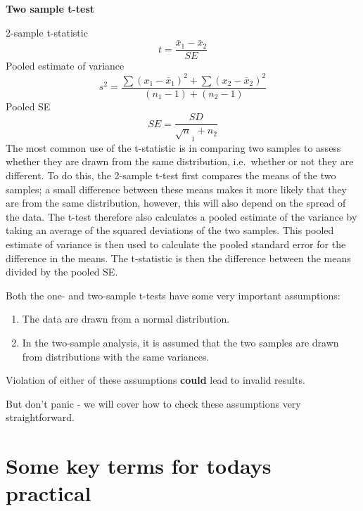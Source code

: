 \documentclass[
]{book}
\providecommand{\tightlist}{%
  \setlength{\itemsep}{0pt}\setlength{\parskip}{0pt}}
\begin{document}
\textbf{Two sample t-test}

2-sample t-statistic
\[
t = \frac{\bar x_1 -\bar x_2}{SE}
\]
Pooled estimate of variance
\[
s^2 = \frac{\sum(x_1 - \bar x_1)^2 + \sum(x_2 - \bar x_2)^2}{(n_1 -1)+(n_2 -1)}
\]
Pooled SE
\[
SE = \frac{SD}{\sqrt n_1 +n_2}
\]
The most common use of the t-statistic is in comparing two samples to assess whether they are drawn from the same distribution, i.e.~whether or not they are different. To do this, the 2-sample t-test first compares the means of the two samples; a small difference between these means makes it more likely that they are from the same distribution, however, this will also depend on the spread of the data. The t-test therefore also calculates a pooled estimate of the variance by taking an average of the squared deviations of the two samples. This pooled estimate of variance is then used to calculate the pooled standard error for the difference in the means. The t-statistic is then the difference between the means divided by the pooled SE.

Both the one- and two-sample t-tests have some very important assumptions:

\begin{enumerate}
\def\labelenumi{\arabic{enumi})}
\tightlist
\item
  The data are drawn from a normal distribution.
\item
  In the two-sample analysis, it is assumed that the two samples are drawn from distributions with the same variances.
\end{enumerate}

Violation of either of these assumptions \textbf{could} lead to invalid results.

But don't panic - we will cover how to check these assumptions very straightforward.

\section{Some key terms for todays practical}\label{some-key-terms-for-todays-practical}
\end{document}
